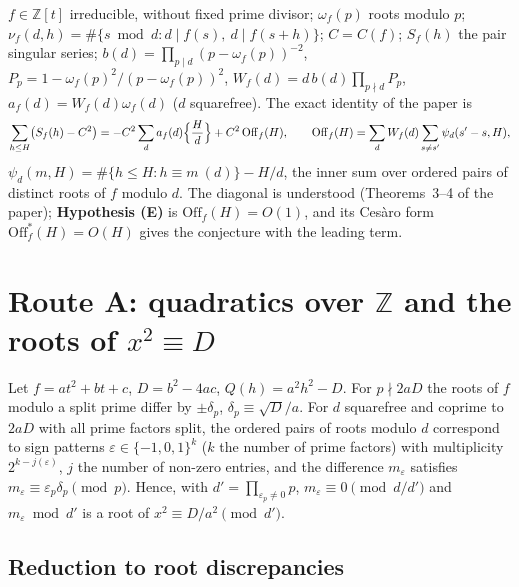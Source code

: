 \documentclass[11pt,a4paper]{article}
\newcommand{\Z}{\mathbb{Z}}
\newcommand{\Off}{\mathrm{Off}}
\begin{document}
$f\in\Z[t]$ irreducible, without fixed prime divisor; $\omega_f(p)$ roots modulo $p$;
$\nu_f(d,h)=\#\{s\bmod d: d\mid f(s),\ d\mid f(s+h)\}$; $C=C(f)$; $S_f(h)$ the pair singular series;
$b(d)=\prod_{p\mid d}(p-\omega_f(p))^{-2}$, $P_p=1-\omega_f(p)^2/(p-\omega_f(p))^2$,
$W_f(d)=d\,b(d)\prod_{p\nmid d}P_p$, $a_f(d)=W_f(d)\omega_f(d)$ ($d$ squarefree). The exact identity
of the paper is
\begin{equation}\label{eq:id}
\sum_{h\le H}\bigl(S_f(h)-C^2\bigr)=-C^2\sum_{d}a_f(d)\Bigl\{\frac Hd\Bigr\}+C^2\,\Off_f(H),\qquad
\Off_f(H)=\sum_dW_f(d)\sum_{s\ne s'}\psi_d(s'-s,H),
\end{equation}
$\psi_d(m,H)=\#\{h\le H:h\equiv m\ (d)\}-H/d$, the inner sum over ordered pairs of distinct roots of $f$
modulo $d$. The diagonal is understood (Theorems~3--4 of the paper); \textbf{Hypothesis (E)} is
$\Off_f(H)=O(1)$, and its Ces\`aro form $\Off^\ast_f(H)=O(H)$ gives the conjecture with the leading term.

\section{Route A: quadratics over $\Z$ and the roots of $x^2\equiv D$}\label{sec:A}

Let $f=at^2+bt+c$, $D=b^2-4ac$, $Q(h)=a^2h^2-D$. For $p\nmid2aD$ the roots of $f$ modulo a split prime
differ by $\pm\delta_p$, $\delta_p\equiv\sqrt D/a$. For $d$ squarefree and coprime to $2aD$ with all
prime factors split, the ordered pairs of roots modulo $d$ correspond to sign patterns
$\varepsilon\in\{-1,0,1\}^{k}$ ($k$ the number of prime factors) with multiplicity $2^{k-j(\varepsilon)}$,
$j$ the number of non-zero entries, and the difference $m_\varepsilon$ satisfies
$m_\varepsilon\equiv\varepsilon_p\delta_p\pmod p$. Hence, with $d'=\prod_{\varepsilon_p\ne0}p$,
$m_\varepsilon\equiv0\pmod{d/d'}$ and $m_\varepsilon\bmod d'$ is a root of $x^2\equiv D/a^2\pmod{d'}$.

\subsection{Reduction to root discrepancies}
\end{document}
